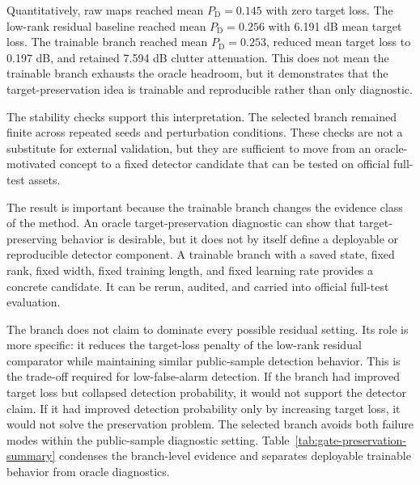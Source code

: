 \documentclass[journal]{IEEEtran}
\begin{document}
Quantitatively, raw maps reached mean $P_{\mathrm{D}}=0.145$ with zero target loss. The low-rank residual baseline reached mean $P_{\mathrm{D}}=0.256$ with 6.191 dB mean target loss. The trainable branch reached mean $P_{\mathrm{D}}=0.253$, reduced mean target loss to 0.197 dB, and retained 7.594 dB clutter attenuation. This does not mean the trainable branch exhausts the oracle headroom, but it demonstrates that the target-preservation idea is trainable and reproducible rather than only diagnostic.

The stability checks support this interpretation. The selected branch remained finite across repeated seeds and perturbation conditions. These checks are not a substitute for external validation, but they are sufficient to move from an oracle-motivated concept to a fixed detector candidate that can be tested on official full-test assets.

The result is important because the trainable branch changes the evidence class of the method. An oracle target-preservation diagnostic can show that target-preserving behavior is desirable, but it does not by itself define a deployable or reproducible detector component. A trainable branch with a saved state, fixed rank, fixed width, fixed training length, and fixed learning rate provides a concrete candidate. It can be rerun, audited, and carried into official full-test evaluation.

The branch does not claim to dominate every possible residual setting. Its role is more specific: it reduces the target-loss penalty of the low-rank residual comparator while maintaining similar public-sample detection behavior. This is the trade-off required for low-false-alarm detection. If the branch had improved target loss but collapsed detection probability, it would not support the detector claim. If it had improved detection probability only by increasing target loss, it would not solve the preservation problem. The selected branch avoids both failure modes within the public-sample diagnostic setting. Table~\ref{tab:gate-preservation-summary} condenses the branch-level evidence and separates deployable trainable behavior from oracle diagnostics.
\end{document}
